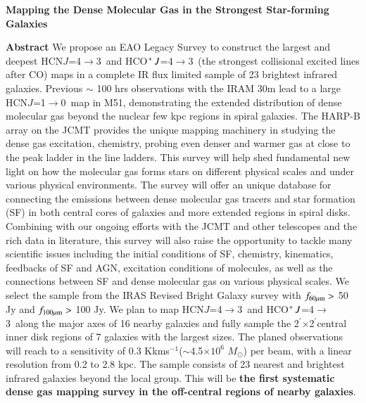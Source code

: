 \documentclass[legal,11pt]{article}
\def\kms    {\ifmmode{{\rm \ts km\ts s}^{-1}}\else{\ts km\ts s$^{-1}$}\fi}
\def\kms    {km\,s$^{-1}$\,}
\def\arcmin {\hbox{$^{\prime}$}}
\def\Kkms{K\,\kms }
\def\,{\thinspace}
\def\Msun{$M_\odot$}
\def\HCNoz      {HCN\,$J$=1$\rightarrow$0}
\def\HCNft        {HCN\,$J$=4$\rightarrow$3}
\def\HCOPft     {HCO$^+\,J$=4$\rightarrow$3}
\begin{document}
\begin{center}
        {\large\bf Mapping the Dense Molecular Gas in the Strongest Star-forming Galaxies}


\vspace { 0.5 cm}
 {\Large\bf Abstract} 
\justify
{{We propose an EAO Legacy Survey to construct the largest and deepest \HCNft\
        and \HCOPft\ (the strongest collisional excited lines after CO) maps in
        a complete IR flux limited sample of 23 brightest infrared galaxies.
        Previous $\sim$ 100 hrs observations with the IRAM 30m lead to a large
        \HCNoz\ map in M51, demonstrating the extended distribution of dense
        molecular gas beyond the nuclear few kpc regions in spiral galaxies.
        The HARP-B array on the JCMT provides the unique mapping machinery in
        studying the dense gas excitation, chemistry, probing even denser and
        warmer gas at close to the peak ladder in the line ladders.  This
        survey will help shed fundamental new light on how the molecular gas
        forms stars on different physical scales and under various physical
        environments.  The survey will offer an unique database for connecting
        the emissions between dense molecular gas tracers and star formation
        (SF) in both central cores of galaxies and more extended regions in
        spiral disks.  Combining with our ongoing efforts with the JCMT and
        other telescopes and the rich data in literature, this survey will also
        raise the opportunity to tackle many scientific issues including the
        initial conditions of SF, chemistry, kinematics, feedbacks of SF and
        AGN, excitation conditions of molecules, as well as the connections
        between SF and dense molecular gas on various physical scales. We
        select the sample from the IRAS Revised Bright Galaxy survey with
        $f_{\rm 60\mu m}>$ 50 Jy and $f_{\rm 100\mu m}>$ 100 Jy. We plan to map
        \HCNft\ and \HCOPft\ along the major axes of 16 nearby galaxies and
        fully sample the 2\arcmin$\times$2\arcmin central inner disk regions of
        7 galaxies with the largest sizes. The planed observations will reach
        to a sensitivity of 0.3 \Kkms ($\sim$4.5$\times10^6$ \Msun) per beam,
        with a linear resolution from 0.2 to 2.8 kpc.  The sample consists of
        23 nearest and brightest infrared galaxies beyond the local group. This
        will be {\bf the first systematic dense gas mapping survey in the
        off-central regions of nearby galaxies}. }}

\end{center}
\end{document}
